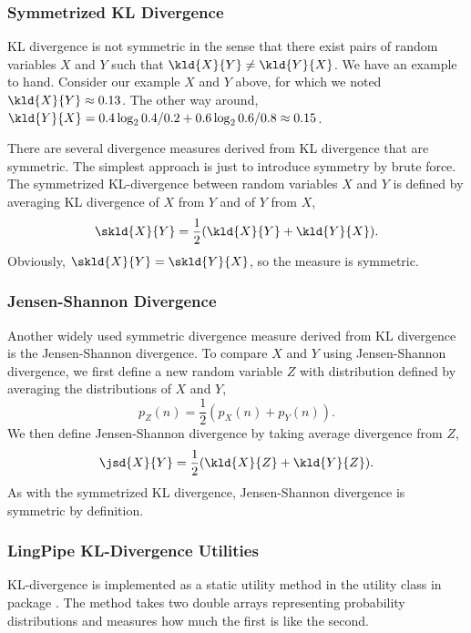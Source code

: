 \subsubsection{Symmetrized KL Divergence}\label{section:stats-symmetrized-kl-divergence}

KL divergence is not symmetric in the sense that there exist pairs of
random variables $X$ and $Y$ such that $\kld{X}{Y} \neq \kld{Y}{X}$.
We have an example to hand.  Consider our example $X$ and $Y$ above,
for which we noted $\kld{X}{Y} \approx 0.13$.  The other way around,
$\kld{Y}{X} = 0.4 \log_2 0.4/0.2 + 0.6 \log_2 0.6/0.8 \approx 0.15$.

There are several divergence measures derived from KL divergence that
are symmetric.  The simplest approach is just to introduce symmetry
by brute force.  The symmetrized KL-divergence between random variables
$X$ and $Y$ is defined by averaging KL divergence of $X$ from $Y$
and of $Y$ from $X$,
%
\begin{equation}
\skld{X}{Y} = \frac{1}{2}(\kld{X}{Y} + \kld{Y}{X}).
\end{equation}
%
Obviously, $\skld{X}{Y} = \skld{Y}{X}$, so the measure is symmetric.


\subsubsection{Jensen-Shannon Divergence}

Another widely used symmetric divergence measure derived from KL divergence
is the Jensen-Shannon divergence.  To compare $X$ and $Y$ using Jensen-Shannon
divergence, we first define a new random variable $Z$ with distribution defined by
averaging the distributions of $X$ and $Y$,
%
\[
p_Z(n) = \frac{1}{2}(p_X(n) + p_Y(n)).
\]
%
We then define Jensen-Shannon divergence by taking average divergence
from $Z$,
%
\begin{equation}
\jsd{X}{Y} = \frac{1}{2}(\kld{X}{Z} + \kld{Y}{Z}).
\end{equation}
%
As with the symmetrized KL divergence, Jensen-Shannon divergence is
symmetric by definition.


\subsubsection{LingPipe KL-Divergence Utilities}

KL-divergence is implemented as a static utility method in the
 utility class in package .
The method takes two double arrays representing probability
distributions and measures how much the first is like the second.

